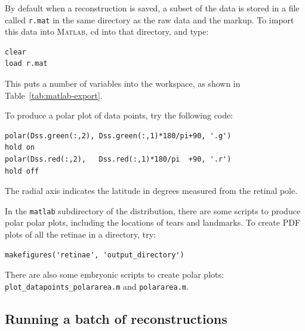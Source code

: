 \documentclass{article}
\begin{document}
By default when a reconstruction is saved, a subset of the data is
stored in a file called \texttt{r.mat} in the same directory as the
raw data and the markup. To import this data into \textsc{Matlab}, cd
into that directory, and type:
\begin{verbatim}
clear
load r.mat
\end{verbatim}
This puts a number of variables into the workspace, as shown in
Table~\ref{tab:matlab-export}.

To produce a polar plot of data points, try the following code:
\begin{verbatim}
polar(Dss.green(:,2), Dss.green(:,1)*180/pi+90, '.g')
hold on
polar(Dss.red(:,2),   Dss.red(:,1)*180/pi  +90, '.r')
hold off
\end{verbatim}
The radial axis indicates the latitude in degrees measured from the
retinal pole.

In the \texttt{matlab} subdirectory of the distribution, there are
some scripts to produce polar polar plots, including the locations of
tears and landmarks. To create PDF plots of all the retinae in a
directory, try:
\begin{verbatim}
makefigures('retinae', 'output_directory')
\end{verbatim}

There are also some embryonic scripts to create polar plots:
\texttt{plot\_datapoints\_polararea.m} and \texttt{polararea.m}.




\subsection{Running a batch of reconstructions}
\label{manual:sec:runn-batch-reconstr}
\end{document}
